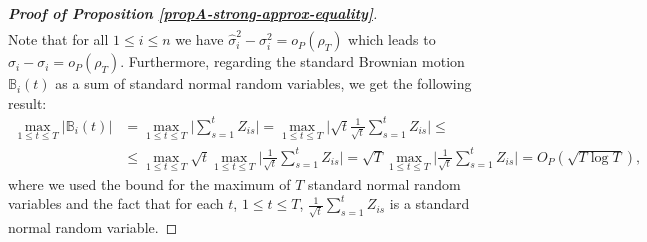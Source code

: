 \documentclass[a4paper,12pt]{article}
\begin{document}
\begin{proof}[\textnormal{\textbf{Proof of Proposition \ref{propA-strong-approx-equality}}}]
\begin{align*}
\end{align*}
Note that for all $1 \le i \le n$ we have $\widehat{\sigma}_i^2 - \sigma_i^2 = o_P(\rho_T)$ which leads to $\widehat{\sigma}_i - \sigma_i = o_P(\rho_T)$. Furthermore, regarding the standard Brownian motion $\mathbb{B}_{i}(t)$ as a sum of standard normal random variables, we get the following result:
\begin{align*}
 \max_{1 \le t \le T} |\mathbb{B}_{i}(t) | &=  \max_{1 \le t \le T}\big|\sum_{s=1}^t Z_{is} \big| = \max_{1 \le t \le T}\Big|\sqrt{t} \frac{1}{\sqrt{t}}\sum_{s=1}^t Z_{is} \Big| \le \\
 &\le \max_{1 \le t \le T}\sqrt{t}  \max_{1 \le t \le T}\Big| \frac{1}{\sqrt{t}}\sum_{s=1}^t Z_{is} \Big| = \sqrt{T}  \max_{1 \le t \le T}\Big| \frac{1}{\sqrt{t}}\sum_{s=1}^t Z_{is} \Big| = O_P(\sqrt{T \log T}),
\end{align*}
where we used the bound for the maximum of $T$ standard normal random variables and the fact that for each $t$, $1\le t \le T$, $ \frac{1}{\sqrt{t}}\sum_{s=1}^t Z_{is}$ is a standard normal random variable.


\end{proof}
\end{document}
